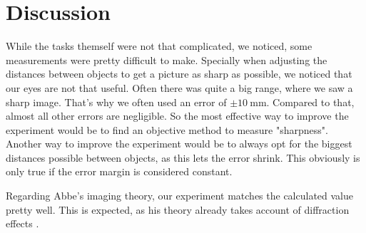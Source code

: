 \section{Discussion}
While the tasks themself were not that complicated, we noticed, some measurements were pretty difficult to make.
Specially when adjusting the distances between objects to get a picture as sharp as possible, we noticed that our eyes are not that useful.
Often there was quite a big range, where we saw a sharp image.
That's why we often used an error of $\pm \SI{10}{\milli\meter}$.
Compared to that, almost all other errors are negligible.
So the most effective way to improve the experiment would be to find an objective method to measure "sharpness".
Another way to improve the experiment would be to always opt for the biggest distances possible between objects, as this lets the error shrink.
This obviously is only true if the error margin is considered constant.

Regarding Abbe's imaging theory, our experiment matches the calculated value pretty well. 
This is expected, as his theory already takes account of diffraction effects \cite{manual}.